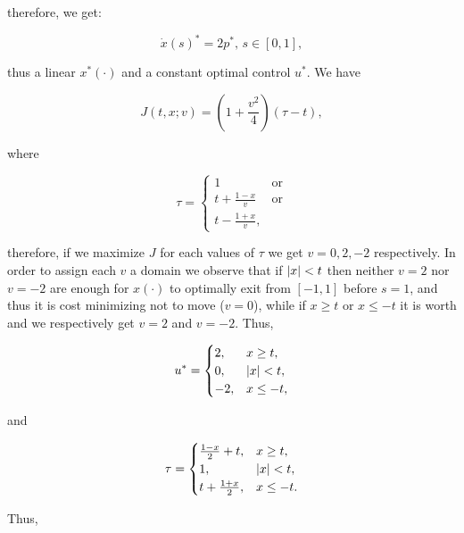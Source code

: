 therefore, we get:

\[\dot{x}(s)^{\ast} = 2p^{\ast},\,s\in[0,1],\]

thus a linear $x^{\ast}(\cdot)$ and a constant optimal control $u^{\ast}$. We have

\begin{equation*}
    J(t,x;v) = \left(1+\frac{v^2}{4}\right)(\tau - t), 
\end{equation*}

where 

\[\tau = \begin{cases}
    1 & \text{or}\\
    t + \frac{1-x}{v} & \text{or}\\
    t - \frac{1+x}{v},
\end{cases}\]

therefore, if we maximize $J$ for each values of $\tau$ we get $v=0,2,-2$ respectively.  In order to assign each $v$ a domain we observe that if $\abs{x}<t$ then neither $v=2$ nor $v=-2$ are enough for $x(\cdot)$ to optimally exit from $[-1,1]$ before $s=1$, and thus it is cost minimizing not to move ($v=0$), while if $x\geq t$ or $x\leq -t$ it is worth and we respectively get $v=2$ and $v=-2$. Thus,

\[ u^{\ast}=\begin{cases}
    2, & x\geq t, \\
    0, & \abs{x}< t,\\
    -2, & x\leq -t,
\end{cases}\]

and

\[\tau = \begin{cases}
    \frac{1-x}{2}+t, & x\geq t,\\
    1, & \abs{x}<t,\\
    t+\frac{1+x}{2}, & x\leq-t.
\end{cases}\]

Thus,





